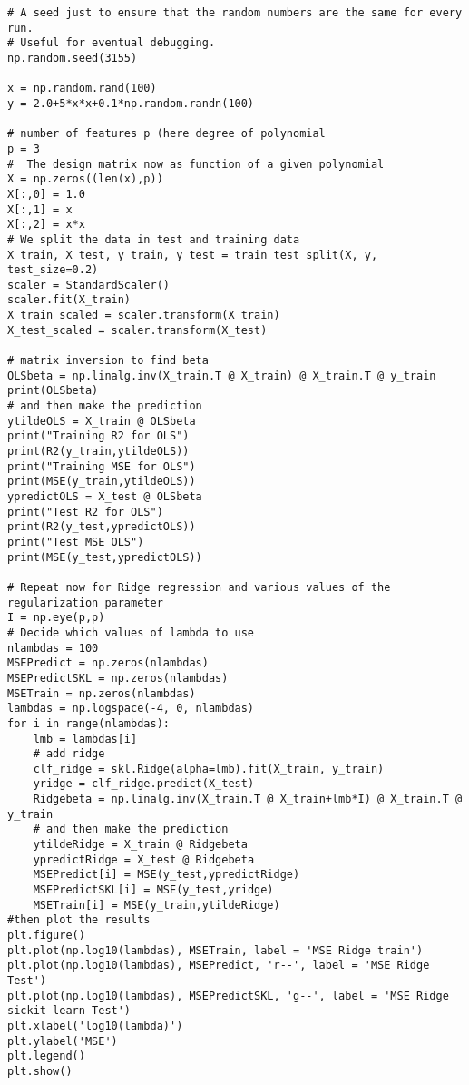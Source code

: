 \documentclass[%
oneside,                 %
final,                   %
10pt]{article}
\newenvironment{doconceexercise}{}{}
\begin{document}
\begin{doconceexercise}
\begin{verbatim}
# A seed just to ensure that the random numbers are the same for every run.
# Useful for eventual debugging.
np.random.seed(3155)

x = np.random.rand(100)
y = 2.0+5*x*x+0.1*np.random.randn(100)

# number of features p (here degree of polynomial
p = 3
#  The design matrix now as function of a given polynomial
X = np.zeros((len(x),p))
X[:,0] = 1.0
X[:,1] = x
X[:,2] = x*x
# We split the data in test and training data
X_train, X_test, y_train, y_test = train_test_split(X, y, test_size=0.2)
scaler = StandardScaler()
scaler.fit(X_train)
X_train_scaled = scaler.transform(X_train)
X_test_scaled = scaler.transform(X_test)

# matrix inversion to find beta
OLSbeta = np.linalg.inv(X_train.T @ X_train) @ X_train.T @ y_train
print(OLSbeta)
# and then make the prediction
ytildeOLS = X_train @ OLSbeta
print("Training R2 for OLS")
print(R2(y_train,ytildeOLS))
print("Training MSE for OLS")
print(MSE(y_train,ytildeOLS))
ypredictOLS = X_test @ OLSbeta
print("Test R2 for OLS")
print(R2(y_test,ypredictOLS))
print("Test MSE OLS")
print(MSE(y_test,ypredictOLS))

# Repeat now for Ridge regression and various values of the regularization parameter
I = np.eye(p,p)
# Decide which values of lambda to use
nlambdas = 100
MSEPredict = np.zeros(nlambdas)
MSEPredictSKL = np.zeros(nlambdas)
MSETrain = np.zeros(nlambdas)
lambdas = np.logspace(-4, 0, nlambdas)
for i in range(nlambdas):
    lmb = lambdas[i]
    # add ridge
    clf_ridge = skl.Ridge(alpha=lmb).fit(X_train, y_train)
    yridge = clf_ridge.predict(X_test)
    Ridgebeta = np.linalg.inv(X_train.T @ X_train+lmb*I) @ X_train.T @ y_train
    # and then make the prediction
    ytildeRidge = X_train @ Ridgebeta
    ypredictRidge = X_test @ Ridgebeta
    MSEPredict[i] = MSE(y_test,ypredictRidge)
    MSEPredictSKL[i] = MSE(y_test,yridge)
    MSETrain[i] = MSE(y_train,ytildeRidge)
#then plot the results
plt.figure()
plt.plot(np.log10(lambdas), MSETrain, label = 'MSE Ridge train')
plt.plot(np.log10(lambdas), MSEPredict, 'r--', label = 'MSE Ridge Test')
plt.plot(np.log10(lambdas), MSEPredictSKL, 'g--', label = 'MSE Ridge sickit-learn Test')
plt.xlabel('log10(lambda)')
plt.ylabel('MSE')
plt.legend()
plt.show()

\end{verbatim}




\end{doconceexercise}
\end{document}

